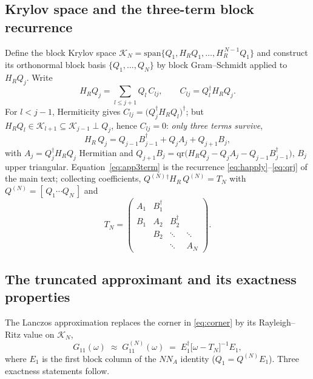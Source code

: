 \documentclass[aps,prx,reprint,superscriptaddress,nofootinbib,longbibliography]{revtex4-2}
\newcommand{\HR}{H_R}
\begin{document}
\subsection{Krylov space and the three-term block recurrence}

Define the block Krylov space
$\mathcal{K}_N=\mathrm{span}\{Q_1,\HR Q_1,\dots,\HR^{\,N-1}Q_1\}$ and
construct its orthonormal block basis $\{Q_1,\dots,Q_N\}$ by block
Gram--Schmidt applied to $\HR Q_j$. Write
\begin{equation}
  \HR Q_j=\sum_{l\le j+1} Q_l\,C_{lj},
  \qquad C_{lj}=Q_l^{\dagger}\HR Q_j .
\end{equation}
For $l<j-1$, Hermiticity gives
$C_{lj}=\big(Q_j^{\dagger}\HR Q_l\big)^{\dagger}$; but
$\HR Q_l\in\mathcal{K}_{l+1}\subseteq\mathcal{K}_{j-1}\perp Q_j$, hence
$C_{lj}=0$: \emph{only three terms survive},
\begin{equation}
  \HR\,Q_j = Q_{j-1}B_{j-1}^{\dagger} + Q_j A_j + Q_{j+1}B_j ,
  \label{eq:app3term}
\end{equation}
with $A_j=Q_j^{\dagger}\HR Q_j$ Hermitian and
$Q_{j+1}B_j=\mathrm{qr}\!\big(\HR Q_j-Q_jA_j-Q_{j-1}B_{j-1}^{\dagger}\big)$,
$B_j$ upper triangular. Equation~\eqref{eq:app3term} is the recurrence
\eqref{eq:happly}--\eqref{eq:qrj} of the main text; collecting coefficients,
$Q^{(N)}{}^{\dagger}\HR\,Q^{(N)}=T_N$ with
$Q^{(N)}=[\,Q_1\cdots Q_N\,]$ and
\begin{equation}
  T_N=\begin{pmatrix}
   A_1 & B_1^{\dagger} & & \\
   B_1 & A_2 & B_2^{\dagger} & \\
       & B_2 & \ddots & \ddots \\
       &     & \ddots & A_N
  \end{pmatrix}.
\end{equation}

\subsection{The truncated approximant and its exactness properties}

The Lanczos approximation replaces the corner in \eqref{eq:corner} by its
Rayleigh--Ritz value on $\mathcal{K}_N$,
\begin{equation}
  G_{11}(\omega)\;\approx\;G_{11}^{(N)}(\omega)\;=\;
  E_1^{\dagger}\big[\omega-T_N\big]^{-1}E_1 ,
  \label{eq:appRR}
\end{equation}
where $E_1$ is the first block column of the $NN_A$ identity
($Q_1=Q^{(N)}E_1$). Three exactness statements follow.
\end{document}
